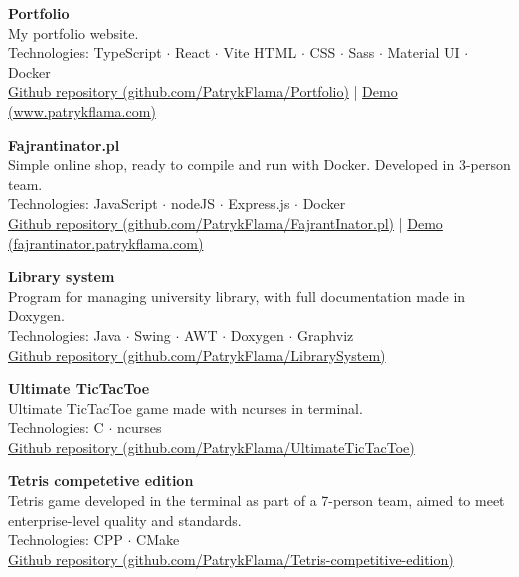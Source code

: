 \documentclass{letter}
\begin{document}
\begin{minipage}[t]{0.70\textwidth}
\begin{tcolorbox}[colback=white, colframe=white, width=\textwidth, boxrule=0pt, sharp corners, height=\textheight, left=5mm, right=5mm, top=5mm, bottom=5mm]
{\textbf{Portfolio}  \\
My portfolio website. \\
{\small Technologies: TypeScript $\cdot$ React $\cdot$ Vite 
HTML $\cdot$ CSS $\cdot$ Sass $\cdot$ Material UI $\cdot$ Docker } \\
{\small \href{https://github.com/PatrykFlama/Portfolio}{Github repository (github.com/PatrykFlama/Portfolio)}} 
| {\small \href{https://www.patrykflama.com/}{Demo (www.patrykflama.com)}}

\textbf{Fajrantinator.pl}  \\
Simple online shop, ready to compile and run with Docker. Developed in 3-person team. \\
{\small Technologies: JavaScript $\cdot$ nodeJS $\cdot$ Express.js $\cdot$ Docker } \\
{\small \href{https://github.com/PatrykFlama/FajrantInator.pl}{Github repository (github.com/PatrykFlama/FajrantInator.pl)}} 
| {\small \href{https://fajrantinator.patrykflama.com/}{Demo (fajrantinator.patrykflama.com)}}

\textbf{Library system}  \\
Program for managing university library, with full documentation made in Doxygen. \\
{\small Technologies: Java $\cdot$ Swing $\cdot$ AWT $\cdot$ Doxygen $\cdot$ Graphviz } \\
{\small \href{https://github.com/PatrykFlama/LibrarySystem}{Github repository (github.com/PatrykFlama/LibrarySystem)}}

\textbf{Ultimate TicTacToe}  \\
Ultimate TicTacToe game made with ncurses in terminal. \\
{\small Technologies:  C $\cdot$ ncurses } \\
{\small \href{https://github.com/PatrykFlama/UltimateTicTacToe}{Github repository (github.com/PatrykFlama/UltimateTicTacToe)}} 

\textbf{Tetris competetive edition}  \\
Tetris game developed in the terminal as part of a 7-person team, aimed to meet enterprise-level quality and standards. \\
{\small Technologies:  CPP $\cdot$ CMake } \\
{\small \href{https://github.com/PatrykFlama/Tetris-competitive-edition}{Github repository (github.com/PatrykFlama/Tetris-competitive-edition)}} 

}
\end{tcolorbox}
\end{minipage}
\end{document}
